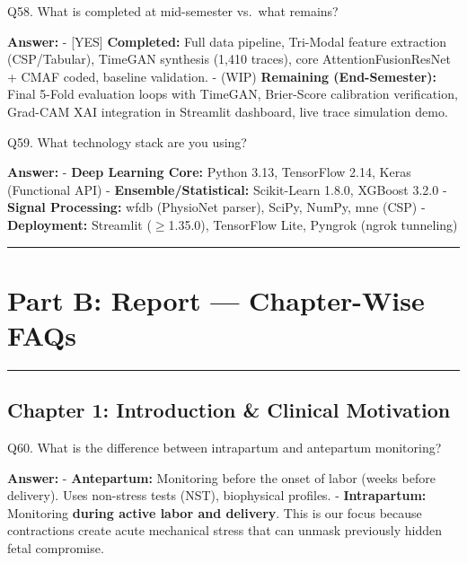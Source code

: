 \documentclass[11pt,a4paper]{article}
\begin{document}
\begin{questionbox}
Q58. What is completed at mid-semester vs.~what remains?
\end{questionbox}
\textbf{Answer:} - {\color{green}\textsf{[YES]}} \textbf{Completed:} Full data pipeline, Tri-Modal
feature extraction (CSP/Tabular), TimeGAN synthesis (1,410 traces), core
AttentionFusionResNet + CMAF coded, baseline validation. - (WIP)
\textbf{Remaining (End-Semester):} Final 5-Fold evaluation loops with
TimeGAN, Brier-Score calibration verification, Grad-CAM XAI integration
in Streamlit dashboard, live trace simulation demo.

\begin{questionbox}
Q59. What technology stack are you using?
\end{questionbox}
\textbf{Answer:} - \textbf{Deep Learning Core:} Python 3.13, TensorFlow 2.14,
Keras (Functional API) - \textbf{Ensemble/Statistical:} Scikit-Learn
1.8.0, XGBoost 3.2.0 - \textbf{Signal Processing:} wfdb (PhysioNet
parser), SciPy, NumPy, mne (CSP) - \textbf{Deployment:} Streamlit
($\geq$1.35.0), TensorFlow Lite, Pyngrok (ngrok tunneling)

\begin{center}\rule{0.5\linewidth}{0.5pt}\end{center}

\section{Part B: Report --- Chapter-Wise
FAQs}\label{part-b-report-chapter-wise-faqs}

\begin{center}\rule{0.5\linewidth}{0.5pt}\end{center}

\subsection{Chapter 1: Introduction \& Clinical
Motivation}\label{chapter-1-introduction-clinical-motivation}

\begin{questionbox}
Q60. What is the difference between intrapartum and antepartum
monitoring?
\end{questionbox}
\textbf{Answer:} - \textbf{Antepartum:} Monitoring before the onset of labor
(weeks before delivery). Uses non-stress tests (NST), biophysical
profiles. - \textbf{Intrapartum:} Monitoring \textbf{during active labor
and delivery}. This is our focus because contractions create acute
mechanical stress that can unmask previously hidden fetal compromise.
\end{document}
